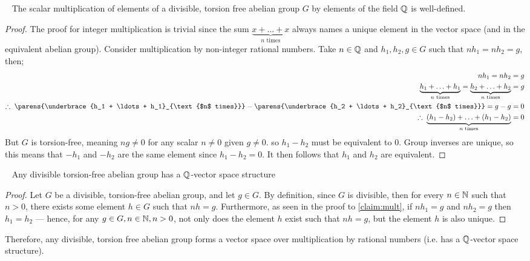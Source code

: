 \begin{claim}~\label{claim:mult}
  The scalar multiplication of elements of a divisible, torsion free
  abelian group $G$ by elements of the field $\mathbb{Q}$ is well-defined.
  
  \begin{proof}
    The proof for integer multiplication is trivial since
    the sum $\underbrace{x + \ldots + x}_{\text{$n$ times}}$
    always names a unique element in the vector space
    (and in the equivalent abelian group).
    Consider multiplication by non-integer rational numbers.
    Take $n \in \mathbb{Q}$ and $h_1, h_2, g \in G$ such that $nh_1 = nh_2 = g$,
    then;
    \begin{align*}
      nh_1 = nh_2 &= g \\
      \underbrace{h_1 + \ldots + h_1}_{\text{$n$ times}}
        = \underbrace{h_2 + \ldots + h_2}_{\text{$n$ times}} &= g \\
      \Therefore \parens{\underbrace{h_1 + \ldots + h_1}_{\text{$n$ times}}}
        - \parens{\underbrace{h_2 + \ldots + h_2}_{\text{$n$ times}}} = g - g &= 0 \\
      \Therefore \underbrace{(h_1 - h_2) + \ldots + (h_1 - h_2)}_{\text{$n$ times}} &= 0
    \end{align*}
    But $G$ is torsion-free, meaning $ng \neq 0$ for any scalar $n \neq 0$
    given $g \neq 0$. so $h_1 - h_2$ must be equivalent to $0$.
    Group inverses are unique, so this means that $-h_1$ and $-h_2$ are
    the same element since $h_1 - h_2 = 0$.
    It then follows that $h_1$ and $h_2$ are equivalent.
  \end{proof}
\end{claim}

\begin{claim}~\label{claim:div-vec-space}
  Any divisible torsion-free abelian group has a $\mathbb{Q}$-vector space structure

  \begin{proof}
    Let $G$ be a divisible, torsion-free abelian group,
    and let $g \in G$.
    By definition, since $G$ is divisible, then for every $n \in \mathbb{N}$
    such that $n > 0$, there exists some element $h \in G$ such that
    $nh = g$. Furthermore, as seen in the proof to \ref{claim:mult},
    if $nh_1 = g$ and $nh_2 = g$ then $h_1 = h_2$
    --- hence, for any $g \in G, n \in \mathbb{N}, n > 0$, not only does the
    element $h$ exist such that $nh = g$, but the element $h$
    is also unique.
  \end{proof}
\end{claim}
Therefore, any divisible, torsion free abelian group
forms a vector space over multiplication by rational numbers
(i.e. has a $\mathbb{Q}$-vector space structure).

